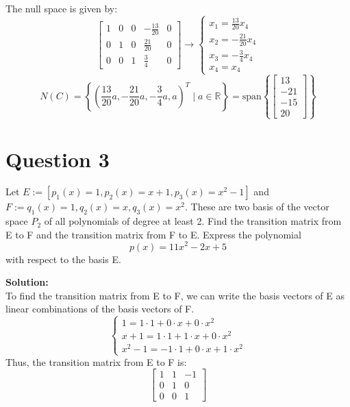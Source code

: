 \documentclass{article}
\begin{document}
\noindent The null space is given by:
$$
\left[\begin{array}{cccc|c} 1 & 0 & 0 & -\frac{13}{20} & 0 \\ 0 & 1 & 0 & \frac{21}{20} & 0 \\ 0 & 0 & 1 & \frac{3}{4} & 0 \end{array}\right]
\rightarrow
\begin{cases} x_1 = \frac{13}{20}x_4 \\ x_2 = -\frac{21}{20}x_4 \\ x_3 = -\frac{3}{4}x_4 \\ x_4 = x_4 \end{cases}
$$
$$
N(C) = \left\{ \left(\frac{13}{20}a, -\frac{21}{20}a, -\frac{3}{4}a, a\right)^T \mid a \in \mathbb{R} \right\}
= \text{span}\left\{ \begin{bmatrix} 13 \\ -21 \\ -15 \\ 20 \end{bmatrix} \right\}
$$

\newpage
\section*{Question 3}
Let $E := [p_{1}(x) = 1, p_{2}(x) = x + 1, p_{3}(x) = x^2 - 1]$ and $F := q_{1}(x) = 1, q_{2}(x) = x, q_{3}(x) = x^2$.
These are two basis of the vector space $P_2$ of all polynomials of degree at least 2. 
Find the transition matrix from E to F and the transition matrix from F to E.
Express the polynomial $$p(x) = 11x^2 - 2x + 5$$ with respect to the basis E.

\vspace{0.5cm}
\noindent\textbf{Solution:} \\
To find the transition matrix from E to F, we can write the basis vectors of E as linear combinations of the basis vectors of F.
$$
\begin{cases} 1 = 1 \cdot 1 + 0 \cdot x + 0 \cdot x^2 \\ 
    x + 1 = 1 \cdot 1 + 1 \cdot x + 0 \cdot x^2 \\ 
    x^2 - 1 = -1 \cdot 1 + 0 \cdot x + 1 \cdot x^2 
\end{cases}
$$
Thus, the transition matrix from E to F is:
$$ \begin{bmatrix} 1 & 1 & -1 \\ 0 & 1 & 0 \\ 0 & 0 & 1 \end{bmatrix} $$
\end{document}
